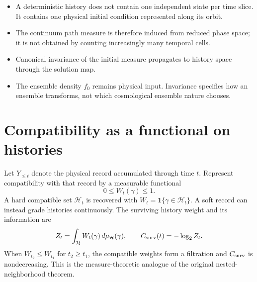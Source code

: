 \documentclass[10pt]{article}
\newenvironment{persuasions}
  {\begin{cpbox}\small\setlength{\parskip}{0pt}%
   {\footnotesize\bfseries\color{accent}%
    \textls[110]{CONCEPTUAL PERSUASIONS}}\par\vspace{3pt}%
   \begin{itemize}[leftmargin=1.15em,itemsep=2.5pt,topsep=0pt,parsep=0pt,
                   label=\textcolor{accent}{\scriptsize$\blacktriangleright$}]}
  {\end{itemize}\end{cpbox}}
\begin{document}
\begin{persuasions}
\item A deterministic history does not contain one independent state per time
slice.  It contains one physical initial condition represented along its orbit.
\item The continuum path measure is therefore induced from reduced phase
space; it is not obtained by counting increasingly many temporal cells.
\item Canonical invariance of the initial measure propagates to history space
through the solution map.
\item The ensemble density $f_0$ remains physical input.  Invariance specifies
how an ensemble transforms, not which cosmological ensemble nature chooses.
\end{persuasions}

\section*{Compatibility as a functional on histories}

Let $Y_{\leq t}$ denote the physical record accumulated through time $t$.
Represent compatibility with that record by a measurable functional
\begin{equation}
0\leq W_t(\gamma)\leq1.
\label{eq:compatibility-functional}
\end{equation}
A hard compatible set $\mathcal H_t$ is recovered with
$W_t=\mathbf1\{\gamma\in\mathcal H_t\}$.  A soft record can instead grade
histories continuously.  The surviving history weight and its information are
\begin{equation}
Z_t=\int_{\mathcal H}W_t(\gamma)\,d\mu_{\mathcal H}(\gamma),
\qquad
C_{\rm surv}(t)=-\log_2 Z_t.
\label{eq:survival-information}
\end{equation}
When $W_{t_2}\leq W_{t_1}$ for $t_2\geq t_1$, the compatible weights form a
filtration and $C_{\rm surv}$ is nondecreasing.  This is the measure-theoretic
analogue of the original nested-neighborhood theorem.
\end{document}
